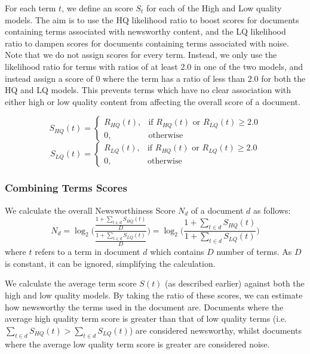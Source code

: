 For each term \(t\), we define an score \(S_t\) for each of the High and Low quality models. The aim is to use the HQ likelihood ratio to boost scores for documents containing terms associated with newsworthy content, and the LQ likelihood ratio to dampen scores for documents containing terms associated with noise.
Note that we do not assign scores for every term.
Instead, we only use the likelihood ratio for terms with ratios of at least 2.0 in one of the two models, and instead assign a score of 0 where the term has a ratio of less than 2.0 for both the HQ and LQ models.
This prevents terms which have no clear association with either high or low quality content from affecting the overall score of a document.

\begin{equation}
	S_{HQ}(t) =
	\begin{cases}
    R_{HQ}(t) ,& \text{if } R_{HQ}(t) \text{ or } R_{LQ}(t) \geq 2.0\\
    0,              & \text{otherwise}
	\end{cases}
\end{equation}
\begin{equation}
	S_{LQ}(t) =
	\begin{cases}
    R_{LQ}(t),& \text{if } R_{HQ}(t) \text{ or } R_{LQ}(t) \geq 2.0\\
    0,              & \text{otherwise}
	\end{cases}
\end{equation}
\vspace{-1cm}
\subsubsection{Combining Terms Scores}
We calculate the overall Newsworthiness Score \(N_d\) of a document \(d\) as follows:
\begin{equation}
	N_d =
	\log_2\Bigg({\frac{
		\frac{
			1 + \sum_{t \in d}{S_{HQ}(t)}
		}{
			D
		}
	}{
		\frac{
			1 + \sum_{t \in d}{S_{LQ}(t)}
		}{
			D
		}
	}}\Bigg)
	=
	\log_2\bigg({\frac{
		1 + \sum_{t \in d}{S_{HQ}(t)}
	}{
		1 + \sum_{t \in d}{S_{LQ}(t)}
	}}\bigg)
\end{equation}
where \(t\) refers to a term in document \(d\) which contains \(D\) number of terms. As \(D\) is constant, it can be ignored, simplifying the calculation.

We calculate the average term score \(S(t)\) (as described earlier) against both the high and low quality models.
By taking the ratio of these scores, we can estimate how newsworthy the terms used in the document are.
Documents where the average high quality term score is greater than that of low quality terms (i.e. \( \sum_{t \in d}{S_{HQ}(t)} > \sum_{t \in d}{S_{LQ}(t)} \)) are considered newsworthy, whilst documents where the average low quality term score is greater are considered noise.

